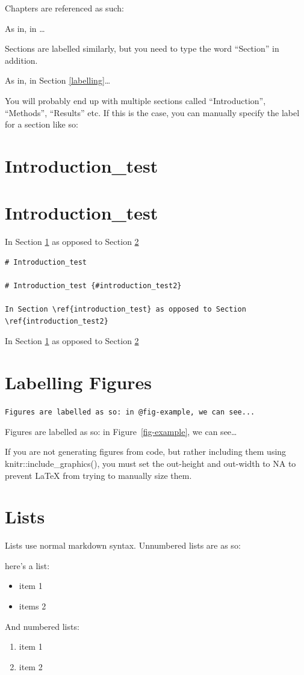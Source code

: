 \documentclass[../main.tex]{subfiles}
\begin{document}
Chapters are referenced as such:


As in, in \ldots{}

Sections are labelled similarly, but you need to type the word
``Section'' in addition.

As in, in Section \ref{labelling}\ldots{}

You will probably end up with multiple sections called ``Introduction'',
``Methods'', ``Results'' etc. If this is the case, you can manually
specify the label for a section like so:

\section{Introduction\_test}\label{introduction_test}

\section{Introduction\_test}\label{introduction_test2}

In Section \ref{introduction_test} as opposed to Section
\ref{introduction_test2}

\begin{verbatim}
# Introduction_test 

# Introduction_test {#introduction_test2}

In Section \ref{introduction_test} as opposed to Section \ref{introduction_test2}
\end{verbatim}

In Section \ref{introduction_test} as opposed to Section
\ref{introduction_test2}

\section{Labelling Figures}\label{labelling-figures}

\texttt{Figures\ are\ labelled\ as\ so:\ in\ @fig-example,\ we\ can\ see...}

Figures are labelled as so: in Figure~\ref{fig-example}, we can
see\ldots{}

If you are not generating figures from code, but rather including them
using knitr::include\_graphics(), you must set the out-height and
out-width to NA to prevent LaTeX from trying to manually size them.

\section{Lists}\label{lists}

Lists use normal markdown syntax. Unnumbered lists are as so:

here's a list:

\begin{itemize}
\tightlist
\item
  item 1
\item
  items 2
\end{itemize}

And numbered lists:

\begin{enumerate}
\def\labelenumi{\arabic{enumi}.}
\tightlist
\item
  item 1
\item
  item 2
\end{enumerate}
\end{document}
